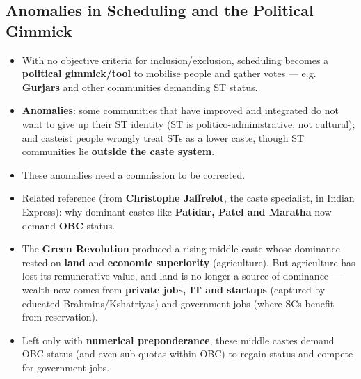 \subsection{Anomalies in Scheduling and the Political Gimmick}

\begin{CriticalPoint}
\begin{itemize}
\item With no objective criteria for inclusion/exclusion, scheduling becomes a \textbf{political gimmick/tool} to mobilise people and gather votes --- e.g. \textbf{Gurjars} and other communities demanding ST status.
\item \textbf{Anomalies}: some communities that have improved and integrated do not want to give up their ST identity (ST is politico-administrative, not cultural); and casteist people wrongly treat STs as a lower caste, though ST communities lie \textbf{outside the caste system}.
\item These anomalies need a commission to be corrected.
\end{itemize}
\end{CriticalPoint}

\begin{ExampleBox}
\begin{itemize}
\item Related reference (from \textbf{Christophe Jaffrelot}, the caste specialist, in Indian Express): why dominant castes like \textbf{Patidar, Patel and Maratha} now demand \textbf{OBC} status.
\item The \textbf{Green Revolution} produced a rising middle caste whose dominance rested on \textbf{land} and \textbf{economic superiority} (agriculture). But agriculture has lost its remunerative value, and land is no longer a source of dominance --- wealth now comes from \textbf{private jobs, IT and startups} (captured by educated Brahmins/Kshatriyas) and government jobs (where SCs benefit from reservation).
\item Left only with \textbf{numerical preponderance}, these middle castes demand OBC status (and even sub-quotas within OBC) to regain status and compete for government jobs.
\end{itemize}
\end{ExampleBox}

